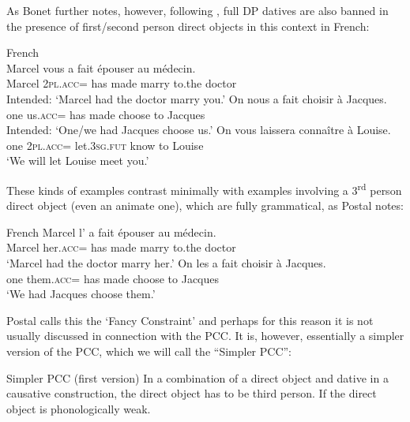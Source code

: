 \documentclass[output=paper,colorlinks,citecolor=brown,nonflat]{./langscibook}
\begin{document}
As Bonet further notes, however, following \citet{Postal1989}, full DP datives are also banned in the presence of first/second person direct objects in this context in French:

\ea%
    \label{ex:sheehan:14}
    French \citep[2]{Postal1989}\\
    \ea\label{ex:sheehan:14a}
    \gll    *Marcel vous   a   fait   épouser   au     médecin.\\
            Marcel   2\textsc{pl}.\textsc{acc}=  has   made   marry   to.the   doctor\\
    \glt    Intended: ‘Marcel had the doctor marry you.’
    \ex\label{ex:sheehan:14b}
    \gll    *On   nous     a   fait     choisir   à Jacques.\\
            one     us.\textsc{acc}= has   made   choose   to Jacques\\
    \glt    Intended: ‘One/we had Jacques choose us.’
    \ex\label{ex:sheehan:14c}
    \gll    *On   vous   laissera   connaître   à Louise.\\
            one   2\textsc{pl}\textsc{.acc}=  let.\textsc{3sg.fut} know     to Louise\\
    \glt    ‘We will let Louise meet you.'
    \z
\z

These kinds of examples contrast minimally with examples involving a 3\textsuperscript{rd} person direct object (even an animate one), which are fully grammatical, as Postal notes:

\ea%
    \label{ex:sheehan:15}
    French \citep[2]{Postal1989}
    \ea\label{ex:sheehan:15a}
    \gll  Marcel   l’       a  fait    épouser   au     médecin.\\
            Marcel   her\textsc{.acc}=  has  made    marry   to.the   doctor\\
    \glt      ‘Marcel had the doctor marry her.’
    \ex\label{ex:sheehan:15b}
    \gll    On   les       a   fait     choisir   à Jacques.\\
            one   them.\textsc{acc}=  has   made   choose   to Jacques\\
    \glt    ‘We had Jacques choose them.’
    \z
\z

Postal calls this the ‘Fancy Constraint’ and perhaps for this reason it is not usually discussed in connection with the PCC. It is, however, essentially a simpler version of the PCC, which we will call the ``Simpler PCC'':

\ea%
    \label{ex:sheehan:16}
    Simpler PCC (first version)
    \ea\label{ex:sheehan:16a}
    In a combination of a direct object and dative in a causative construction, the direct object has to be third person.
    \ex\label{ex:sheehan:16b}
    If the direct object is phonologically weak. 
    \z
\z
\end{document}
